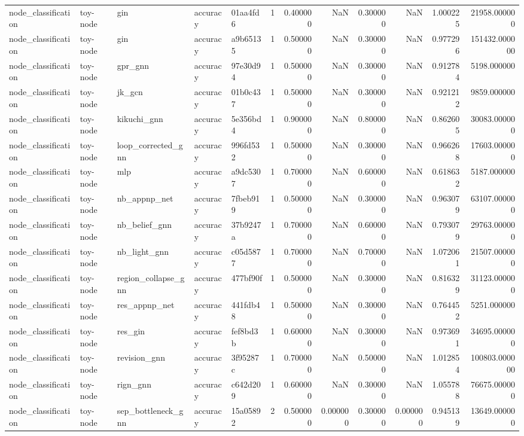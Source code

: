 \begin{tabular}{lllllrrrrrrr}
node_classification & toy-node & gin & accuracy & 01aa4fd6 & 1 & 0.400000 & NaN & 0.300000 & NaN & 1.000225 & 21958.000000 \\
node_classification & toy-node & gin & accuracy & a9b65135 & 1 & 0.500000 & NaN & 0.300000 & NaN & 0.977296 & 151432.000000 \\
node_classification & toy-node & gpr_gnn & accuracy & 97e30d94 & 1 & 0.500000 & NaN & 0.300000 & NaN & 0.912784 & 5198.000000 \\
node_classification & toy-node & jk_gcn & accuracy & 01b0c437 & 1 & 0.500000 & NaN & 0.300000 & NaN & 0.921212 & 9859.000000 \\
node_classification & toy-node & kikuchi_gnn & accuracy & 5e356bd4 & 1 & 0.900000 & NaN & 0.800000 & NaN & 0.862605 & 30083.000000 \\
node_classification & toy-node & loop_corrected_gnn & accuracy & 996fd532 & 1 & 0.500000 & NaN & 0.300000 & NaN & 0.966268 & 17603.000000 \\
node_classification & toy-node & mlp & accuracy & a9dc5307 & 1 & 0.700000 & NaN & 0.600000 & NaN & 0.618632 & 5187.000000 \\
node_classification & toy-node & nb_appnp_net & accuracy & 7fbeb919 & 1 & 0.500000 & NaN & 0.300000 & NaN & 0.963079 & 63107.000000 \\
node_classification & toy-node & nb_belief_gnn & accuracy & 37b9247a & 1 & 0.700000 & NaN & 0.600000 & NaN & 0.793079 & 29763.000000 \\
node_classification & toy-node & nb_light_gnn & accuracy & c05d5877 & 1 & 0.700000 & NaN & 0.700000 & NaN & 1.072061 & 21507.000000 \\
node_classification & toy-node & region_collapse_gnn & accuracy & 477bf90f & 1 & 0.500000 & NaN & 0.300000 & NaN & 0.816329 & 31123.000000 \\
node_classification & toy-node & res_appnp_net & accuracy & 441fdb48 & 1 & 0.500000 & NaN & 0.300000 & NaN & 0.764452 & 5251.000000 \\
node_classification & toy-node & res_gin & accuracy & fef8bd3b & 1 & 0.600000 & NaN & 0.300000 & NaN & 0.973691 & 34695.000000 \\
node_classification & toy-node & revision_gnn & accuracy & 3f95287c & 1 & 0.700000 & NaN & 0.500000 & NaN & 1.012854 & 100803.000000 \\
node_classification & toy-node & rign_gnn & accuracy & c642d209 & 1 & 0.600000 & NaN & 0.300000 & NaN & 1.055788 & 76675.000000 \\
node_classification & toy-node & sep_bottleneck_gnn & accuracy & 15a05892 & 2 & 0.500000 & 0.000000 & 0.300000 & 0.000000 & 0.945139 & 13649.000000 \\

\end{tabular}
